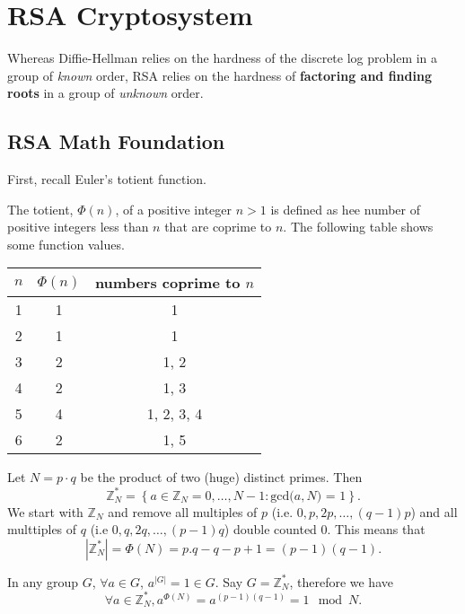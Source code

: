 \section{RSA Cryptosystem}

Whereas Diffie-Hellman relies on the hardness of the discrete log problem in a group of \emph{known} order, RSA relies on the hardness of \textbf{factoring and finding roots} in a group of \emph{unknown} order.

\subsection{RSA Math Foundation}
First, recall Euler's totient function.
\begin{definition}\label{EulerTotient}
    The totient, \(\Phi (n)\), of a positive integer \(n > 1\) is defined as hee number of positive integers less than \(n\) that are coprime to \(n\). The following table shows some function values. \\
    \begin{center}
        \begin{tabular}[h]{|c|c|c|}
            \hline
            \(n\) & \(\Phi (n)\) & numbers coprime to \(n\) \\
            \hline
            1 & 1 & 1 \\
            2 & 1 & 1 \\
            3 & 2 & 1, 2 \\
            4 & 2 & 1, 3 \\
            5 & 4 & 1, 2, 3, 4 \\
            6 & 2 & 1, 5 \\    
            \hline
        \end{tabular}
    \end{center}
\end{definition}

Let \(N=p\cdot q\) be the product of two (huge) distinct primes. Then
\[
    \mathbb{Z}_N^* = \left\{ a \in \mathbb{Z}_N = { 0, \ldots , N - 1} : \text{gcd($a, N$) = 1}  \right\}. 
\]
We start with \(\mathbb{Z}_N\) and remove all multiples of \(p\) (i.e. \(0, p, 2p, \ldots , (q-1)p\)) and all multtiples of \(q\) (i.e \(0, q, 2q, \ldots , (p-1)q\)) double counted 0. This means that
\[
    \left| \mathbb{Z}_N^* \right| = \Phi (N) = p . q - q - p + 1 = (p-1)(q-1). 
\]

\begin{definition}
    In any group \(G\), \(\forall a \in G\), \(a^{|G|} = 1 \in G\). Say \(G = \mathbb{Z}_N^*\), therefore we have
    \[
        \forall a \in \mathbb{Z} _N^*, a^{\Phi (N)} = a^{(p-1)(q-1)} = 1 \mod N.
    \]  
\end{definition}

